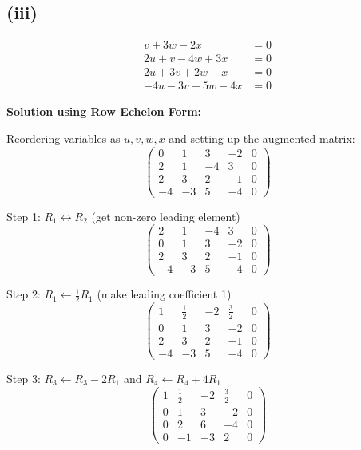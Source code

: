 \subsection*{(iii)}
\begin{align*}
	v + 3w - 2x        & = 0 \\
	2u + v - 4w + 3x   & = 0 \\
	2u + 3v + 2w - x   & = 0 \\
	-4u - 3v + 5w - 4x & = 0
\end{align*}

\textbf{Solution using Row Echelon Form:}

Reordering variables as $u, v, w, x$ and setting up the augmented matrix:
\[
	\left(\begin{array}{cccc|c}
			0  & 1  & 3  & -2 & 0 \\
			2  & 1  & -4 & 3  & 0 \\
			2  & 3  & 2  & -1 & 0 \\
			-4 & -3 & 5  & -4 & 0
		\end{array}\right)
\]

Step 1: $R_1 \leftrightarrow R_2$ (get non-zero leading element)
\[
	\left(\begin{array}{cccc|c}
			2  & 1  & -4 & 3  & 0 \\
			0  & 1  & 3  & -2 & 0 \\
			2  & 3  & 2  & -1 & 0 \\
			-4 & -3 & 5  & -4 & 0
		\end{array}\right)
\]

Step 2: $R_1 \leftarrow \frac{1}{2}R_1$ (make leading coefficient 1)
\[
	\left(\begin{array}{cccc|c}
			1  & \frac{1}{2} & -2 & \frac{3}{2} & 0 \\
			0  & 1           & 3  & -2          & 0 \\
			2  & 3           & 2  & -1          & 0 \\
			-4 & -3          & 5  & -4          & 0
		\end{array}\right)
\]

Step 3: $R_3 \leftarrow R_3 - 2R_1$ and $R_4 \leftarrow R_4 + 4R_1$
\[
	\left(\begin{array}{cccc|c}
			1 & \frac{1}{2} & -2 & \frac{3}{2} & 0 \\
			0 & 1           & 3  & -2          & 0 \\
			0 & 2           & 6  & -4          & 0 \\
			0 & -1          & -3 & 2           & 0
		\end{array}\right)
\]

